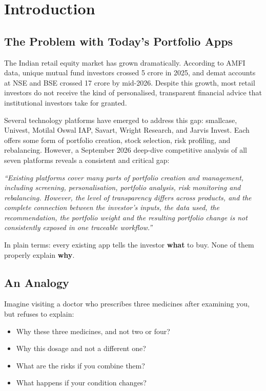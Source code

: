 \documentclass[12pt, a4paper, openany, oneside]{report}
\begin{document}
\setcounter{page}{1}

\chapter{Introduction}

\section{The Problem with Today's Portfolio Apps}

The Indian retail equity market has grown dramatically. According to AMFI data, unique mutual fund investors crossed 5 crore in 2025, and demat accounts at NSE and BSE crossed 17 crore by mid-2026. Despite this growth, most retail investors do not receive the kind of personalised, transparent financial advice that institutional investors take for granted.

Several technology platforms have emerged to address this gap: smallcase, Univest, Motilal Oswal IAP, Savart, Wright Research, and Jarvis Invest. Each offers some form of portfolio creation, stock selection, risk profiling, and rebalancing. However, a September 2026 deep-dive competitive analysis of all seven platforms reveals a consistent and critical gap:

\begin{framed}
\textit{``Existing platforms cover many parts of portfolio creation and management, including screening, personalisation, portfolio analysis, risk monitoring and rebalancing. However, the level of transparency differs across products, and the complete connection between the investor's inputs, the data used, the recommendation, the portfolio weight and the resulting portfolio change is not consistently exposed in one traceable workflow.''}
\end{framed}

In plain terms: every existing app tells the investor \textbf{what} to buy. None of them properly explain \textbf{why}.

\section{An Analogy}

Imagine visiting a doctor who prescribes three medicines after examining you, but refuses to explain:
\begin{itemize}
  \item Why these three medicines, and not two or four?
  \item Why this dosage and not a different one?
  \item What are the risks if you combine them?
  \item What happens if your condition changes?
\end{itemize}
\end{document}
